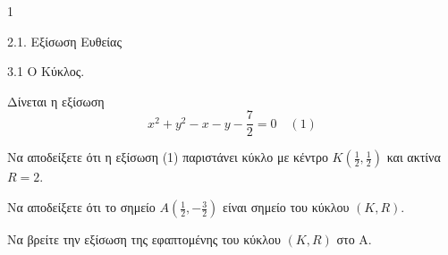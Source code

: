 \begin{ylh}{1}
    \item 2.1. Εξίσωση Ευθείας
    \item 3.1 Ο Κύκλος.
\end{ylh}
Δίνεται η εξίσωση
\[ x^2 + y^2 - x - y - \frac{7}{2} = 0 \quad (1) \]
\begin{alist}
\item Να αποδείξετε ότι η εξίσωση (1) παριστάνει κύκλο με κέντρο $K\left(\frac{1}{2}, \frac{1}{2}\right)$ και ακτίνα $R = 2$. 
\item Να αποδείξετε ότι το σημείο $A\left(\frac{1}{2}, -\frac{3}{2}\right)$ είναι σημείο του κύκλου $(K,R)$. 
\item Να βρείτε την εξίσωση της εφαπτομένης του κύκλου $(K,R)$ στο A. 
\end{alist}